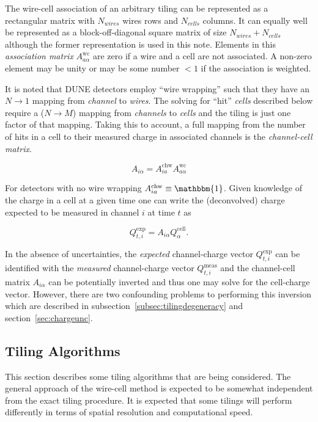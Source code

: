 \documentclass[letter]{article}
\def\mQexp{Q^{\mathrm{exp}}_{t,i}}
\def\Qexp{$\mQexp$\xspace}
\def\mQmeas{Q^{\mathrm{meas}}_{t,i}}
\def\Qmeas{$\mQmeas$\xspace}
\def\mAchc{A_{i\alpha}}
\def\Achc{$\mAchc$\xspace}
\def\mAchw{A^{\mathrm{chw}}_{ia}}
\def\mAwc{A^{\mathrm{wc}}_{a\alpha}}
\def\Awc{$\mAwc$\xspace}
\def\mQcell{Q^{\mathrm{cell}}_\alpha}
\begin{document}
The wire-cell association of an arbitrary tiling can be represented
as a rectangular matrix with $N_{wires}$ wires rows and $N_{cells}$
columns.
It can equally well be represented as a block-off-diagonal square
matrix of size $N_{wires} + N_{cells}$ although the former
representation is used in this note.
Elements in this \textit{association matrix} \Awc are zero if a wire
and a cell are not associated.
A non-zero element may be unity or may be some number $<1$ if the
association is weighted.

It is noted that DUNE detectors employ ``wire wrapping'' such that
they have an $N \to 1$ mapping from \textit{channel} to
\textit{wires}.
The solving for ``hit'' \textit{cells} described below require a ($N
\to M$) mapping from \textit{channels} to \textit{cells} and the
tiling is just one factor of that mapping.
Taking this to account, a full mapping from the number of hits in a
cell to their measured charge in associated channels is the
\textit{channel-cell matrix}.

\begin{equation}
  \label{eq:Achc}
  \mAchc = \mAchw \mAwc
\end{equation}

For detectors with no wire wrapping $\mAchw \equiv \mathbbm{1}$.
Given knowledge of the charge in a cell at a given time one can write
the (deconvolved) charge expected to be measured in channel $i$ at
time $t$ as

\begin{equation}
  \label{eq:Qexp}
  \mQexp = \mAchc \mQcell.
\end{equation}

In the absence of uncertainties, the \textit{expected} channel-charge vector \Qexp
can be identified with the \textit{measured} channel-charge vector \Qmeas and the
channel-cell matrix \Achc can be potentially inverted and thus one may solve
for the cell-charge vector.
However, there are two confounding problems to performing this
inversion which are described in
subsection~\ref{subsec:tilingdegeneracy} and section~\ref{sec:chargeunc}.

\subsection{Tiling Algorithms}
\label{subsec:tilingalg}

This section describes some tiling algorithms that are being considered.
The general approach of the wire-cell method is expected to be
somewhat independent from the exact tiling procedure.
It is expected that some tilings will perform differently in terms of
spatial resolution and computational speed.
\end{document}
